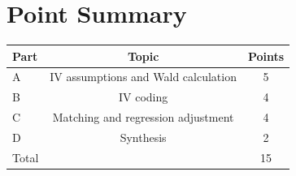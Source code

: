 \documentclass[11pt]{article}
\begin{document}
\section*{Point Summary}
\begin{center}
\begin{tabular}{lcc}
\toprule
Part & Topic & Points \\
\midrule
A & IV assumptions and Wald calculation & 5 \\
B & IV coding & 4 \\
C & Matching and regression adjustment & 4 \\
D & Synthesis & 2 \\
\midrule
Total & & 15 \\
\bottomrule
\end{tabular}
\end{center}
\end{document}
